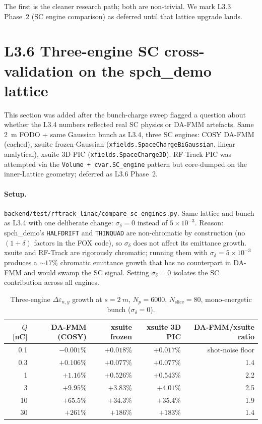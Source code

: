 \documentclass[11pt]{article}
\begin{document}
The first is the cleaner research path; both are non-trivial. We mark
L3.3 Phase~2 (SC engine comparison) as deferred until that lattice
upgrade lands.

\section{L3.6 Three-engine SC cross-validation on the spch\_demo lattice}

This section was added after the bunch-charge sweep flagged a question
about whether the L3.4 numbers reflected real SC physics or DA-FMM
artefacts. Same 2~m FODO + same Gaussian bunch as L3.4, three SC
engines: COSY DA-FMM (cached), xsuite frozen-Gaussian
(\texttt{xfields.SpaceChargeBiGaussian}, linear analytical), xsuite
3D PIC (\texttt{xfields.SpaceCharge3D}). RF-Track PIC was attempted
via the \texttt{Volume + cvar.SC\_engine} pattern but core-dumped on
the inner-Lattice geometry; deferred as L3.6 Phase~2.

\paragraph{Setup.}
\texttt{backend/test/rftrack\_linac/compare\_sc\_engines.py}.
Same lattice and bunch as L3.4 with one deliberate change:
$\sigma_\delta=0$ instead of $5\times 10^{-3}$. Reason: spch\_demo's
\texttt{HALFDRIFT} and \texttt{THINQUAD} are non-chromatic by
construction (no $(1+\delta)$ factors in the FOX code), so
$\sigma_\delta$ does not affect its emittance growth. xsuite and
RF-Track are rigorously chromatic; running them with
$\sigma_\delta=5\times 10^{-3}$ produces a $\sim 17\%$ chromatic
emittance growth that has no counterpart in DA-FMM and would swamp
the SC signal. Setting $\sigma_\delta=0$ isolates the SC contribution
across all engines.

\begin{table}[h]
\caption{Three-engine $\Delta\varepsilon_{n,y}$ growth at $s=\SI{2}{m}$,
$N_p=6000$, $N_\mathrm{slice}=80$, mono-energetic bunch
($\sigma_\delta=0$).}
\label{tab:sc-engines}
\centering
\begin{tabular}{rrrrr}
\toprule
$Q$ [nC] & DA-FMM (COSY) & xsuite frozen & xsuite 3D PIC & DA-FMM/xsuite ratio \\
\midrule
 0.1 & $-0.001\%$ & $+0.018\%$ & $+0.017\%$ & shot-noise floor \\
 0.3 & $+0.106\%$ & $+0.077\%$ & $+0.077\%$ & 1.4 \\
 1   & $+1.16\%$  & $+0.526\%$ & $+0.543\%$ & 2.2 \\
 3   & $+9.95\%$  & $+3.83\%$  & $+4.01\%$  & 2.5 \\
10   & $+65.5\%$  & $+34.3\%$  & $+35.4\%$  & 1.9 \\
30   & $+261\%$   & $+186\%$   & $+183\%$   & 1.4 \\
\bottomrule
\end{tabular}
\end{table}
\end{document}
